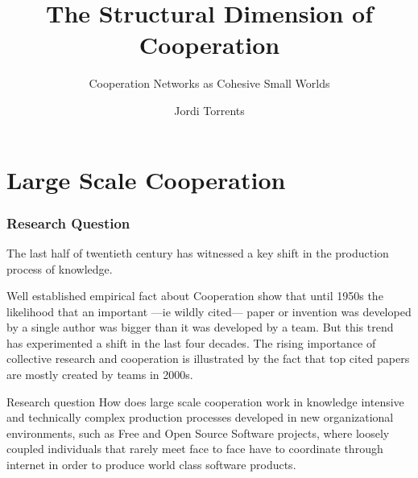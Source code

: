 \documentclass[ignorenonframetext,red,8pt]{beamer}
\title{The Structural Dimension of Cooperation}
\subtitle{Cooperation Networks as Cohesive Small Worlds}
\author{Jordi Torrents}
\institute{University of Barcelona}
\begin{document}
\begin{frame}[label=portada]
\maketitle
\end{frame}


\section{Large Scale Cooperation}

\begin{frame}[label=]
\frametitle{Research Question}

The last half of twentieth century has witnessed a key shift in the production process of knowledge. 

\begin{block}{Well established empirical fact about Cooperation}
\citet*{uzzi:2007a} show that until 1950s the likelihood that an important ---ie wildly cited--- paper or invention was developed by a single author was bigger than it was developed by a team. But this trend has experimented a shift in the last four decades. The rising importance of collective research and cooperation is illustrated by the fact that top cited papers are mostly created by teams in 2000s.
\end{block}

\begin{block}{Research question}
How does large scale cooperation work in knowledge intensive and technically complex production processes developed in new organizational environments, such as Free and Open Source Software projects, where loosely coupled individuals that rarely meet face to face have to coordinate through internet in order to produce world class software products.
\end{block}

\end{frame}
\end{document}
